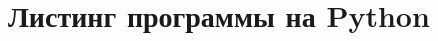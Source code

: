 \documentclass[coursework]{SCWorks}
\begin{document}




\appendix
\section{Листинг программы на Python}
\label{app:python}

\inputminted{python}{code/gradient_descent.py}
\end{document}
